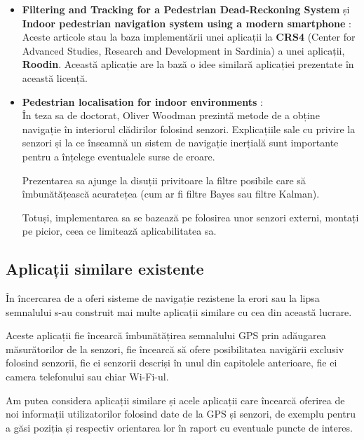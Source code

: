 \documentclass[12pt, a4paper, oneside]{article}
\begin{document}
\begin{itemize}
\item \textbf{Filtering and Tracking for a Pedestrian Dead-Reckoning System} \cite{SDCPA10b} și \textbf{Indoor pedestrian navigation system using a modern smartphone} \cite{SCM10}:\\
Aceste articole stau la baza implementării unei aplicații la \textbf{CRS4} (Center for Advanced Studies, Research and Development in Sardinia) a unei aplicații, \textbf{Roodin}. Această aplicație are la bază o idee similară aplicației prezentate în această licență.

\item \textbf{Pedestrian localisation for indoor environments} \cite{OliverWoodman}:\\
În teza sa de doctorat, Oliver Woodman prezintă metode de a obține navigație în interiorul clădirilor folosind senzori. Explicațiile sale cu privire la senzori și la ce înseamnă un sistem de navigație inerțială sunt importante pentru a înțelege eventualele surse de eroare.

Prezentarea sa ajunge la disuții privitoare la filtre posibile care să îmbunătățească acuratețea (cum ar fi filtre Bayes sau filtre Kalman).

Totuși, implementarea sa se bazează pe folosirea unor senzori externi, montați pe picior, ceea ce limitează aplicabilitatea sa.

\end{itemize}


\subsection{Aplicații similare existente}
În încercarea de a oferi sisteme de navigație rezistene la erori sau la lipsa semnalului s-au construit mai multe aplicații similare cu cea din această lucrare.

Aceste aplicații fie încearcă îmbunătățirea semnalului GPS prin adăugarea măsurătorilor de la senzori, fie încearcă să ofere posibilitatea navigării exclusiv folosind senzorii, fie ei senzorii descriși în unul din capitolele anterioare, fie ei camera telefonului sau chiar Wi-Fi-ul.

Am putea considera aplicații similare și acele aplicații care încearcă oferirea de noi informații utilizatorilor folosind date de la GPS și senzori, de exemplu pentru a găsi poziția și respectiv orientarea lor în raport cu eventuale puncte de interes.
\end{document}
